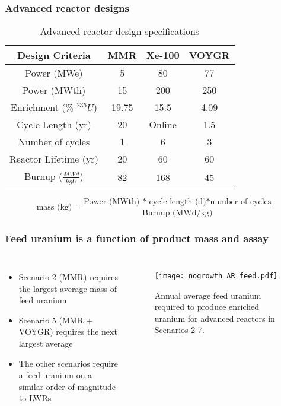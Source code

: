 \begin{frame}
    \frametitle{Advanced reactor designs}
    \begingroup
        \renewcommand{\arraystretch}{1.5}
        \begin{table}
            \small
            \caption{Advanced reactor design specifications}
            \label{tab:reactor_summary}
            \begin{tabular}{ c c c c }
                \hline
                Design Criteria & MMR 
                    \cite{noauthor_usnc_2021} & 
                    Xe-100 \cite{mulder_overview_2021} & 
                    VOYGR \cite{nuscale_chapter_2020-1,reyes_nuscale_2021,reyes_correction_2022}\\\hline
                Power (MWe) & 5 & 80 & 77\\
                Power (MWth) & 15 & 200 & 250\\
                Enrichment (\% $^{235}U$) & 19.75 & 15.5 & 4.09 \\
                Cycle Length (yr) & 20 & Online & 1.5 \\
                Number of cycles & 1 & 6 & 3\\
                Reactor Lifetime (yr) & 20 & 60 & 60\\
                Burnup ($\frac{MWd}{kg U}$) & 82 & 168 & 45\\
                \hline
            \end{tabular}
        \end{table}   
    \endgroup
    \begin{equation*}
        \text{mass (kg)} = \frac{\text{Power (MWth) * cycle length (d)*number of cycles}}{\text{Burnup (MWd/kg)}}
        \label{eq:fuel_mass}
    \end{equation*}
\end{frame}

\begin{frame}
    \frametitle{Feed uranium is a function of product mass and assay}
    \begin{columns}
        \column[t]{4.5cm}
            \begin{itemize}
                \item Scenario 2 (MMR) requires the largest average mass of feed uranium
                \item Scenario 5 (MMR + VOYGR) requires the next largest average
                \item The other scenarios require a feed uranium on a similar order 
                      of magnitude to \glspl{LWR}
                
            \end{itemize}
        \column[t]{5.5cm}
        \vspace{-1cm}
        \begin{figure}
                \centering
                \texttt{[image: nogrowth\_AR\_feed.pdf]}
                \caption{Annual average feed uranium required to produce enriched uranium 
                for advanced reactors in Scenarios 2-7.}
                \label{fig:feed}
        \end{figure}
    \end{columns}
\end{frame}

